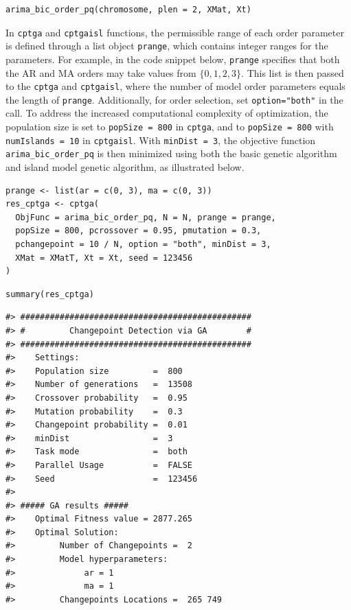 \begin{verbatim}
arima_bic_order_pq(chromosome, plen = 2, XMat, Xt)
\end{verbatim}

In \texttt{cptga} and \texttt{cptgaisl} functions, the permissible range of each order parameter is defined through a list object \texttt{prange}, which contains integer ranges for the parameters. For example, in the code snippet below, \texttt{prange} specifies that both the AR and MA orders may take values from \(\{0, 1, 2, 3\}\). This list is then passed to the \texttt{cptga} and \texttt{cptgaisl}, where the number of model order parameters equals the length of \texttt{prange}. Additionally, for order selection, set \texttt{option="both"} in the call. To address the increased computational complexity of optimization, the population size is set to \texttt{popSize\ =\ 800} in \texttt{cptga}, and to \texttt{popSize\ =\ 800} with \texttt{numIslands\ =\ 10} in \texttt{cptgaisl}. With \texttt{minDist\ =\ 3}, the objective function \texttt{arima\_bic\_order\_pq} is then minimized using both the basic genetic algorithm and island model genetic algorithm, as illustrated below.

\begin{verbatim}
prange <- list(ar = c(0, 3), ma = c(0, 3))
res_cptga <- cptga(
  ObjFunc = arima_bic_order_pq, N = N, prange = prange,
  popSize = 800, pcrossover = 0.95, pmutation = 0.3,
  pchangepoint = 10 / N, option = "both", minDist = 3,
  XMat = XMatT, Xt = Xt, seed = 123456
)
\end{verbatim}

\begin{verbatim}
summary(res_cptga)
\end{verbatim}

\begin{verbatim}
#> ###############################################
#> #         Changepoint Detection via GA        #
#> ###############################################
#>    Settings: 
#>    Population size         =  800 
#>    Number of generations   =  13508 
#>    Crossover probability   =  0.95 
#>    Mutation probability    =  0.3 
#>    Changepoint probability =  0.01 
#>    minDist                 =  3 
#>    Task mode               =  both 
#>    Parallel Usage          =  FALSE 
#>    Seed                    =  123456 
#> 
#> ##### GA results ##### 
#>    Optimal Fitness value = 2877.265 
#>    Optimal Solution: 
#>         Number of Changepoints =  2 
#>         Model hyperparameters:
#>              ar = 1 
#>              ma = 1 
#>         Changepoints Locations =  265 749
\end{verbatim}

